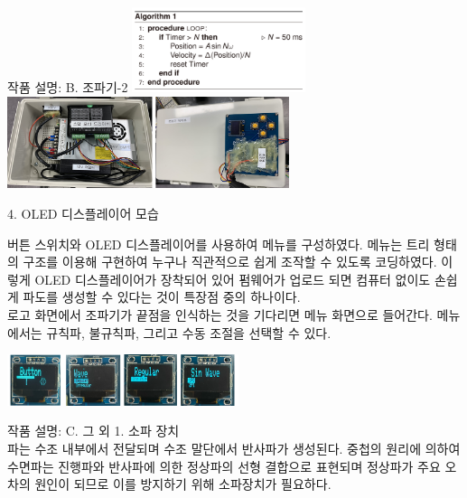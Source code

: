 \documentclass[Junlampaper, portrait]{Junlam_PosterK}
\begin{document}
\begin{poster}
\begin{posterbox}[name=circuit,column=1,below=wtank]{작품 설명: B. 조파기-2}
      \includegraphics[width=0.38\textwidth]{images/algorithm.pdf} 
      \includegraphics[width=0.62\textwidth]{images/made.png} 
     \label{algotithm}

\vspace{1.0em}
\small {4. OLED 디스플레이어 모습 \\}
    \scriptsize {
    
    버튼 스위치와 OLED 디스플레이어를 사용하여 메뉴를 구성하였다. 메뉴는 트리 형태의 구조를 이용해 구현하여 누구나 직관적으로 쉽게 조작할 수 있도록 코딩하였다. 이렇게 OLED 디스플레이어가 장착되어 있어 펌웨어가 업로드 되면 컴퓨터 없이도 손쉽게 파도를 생성할 수 있다는 것이 특장점 중의 하나이다. \\
    로고 화면에서 조파기가 끝점을 인식하는 것을 기다리면 메뉴 화면으로 들어간다. 메뉴에서는 규칙파, 불규칙파, 그리고 수동 조절을 선택할 수 있다. \\}
    
            \includegraphics[width=\textwidth, height=1.5cm]{images/OLED.png} 
        \label{Oled}
\vspace{4.0em}
\end{posterbox}

\begin{posterbox}[name=wmaker,column=2, below=wtank] {작품 설명: C. 그 외} %
\small {1. 소파 장치\\}
    \scriptsize {
    파는 수조 내부에서 전달되며 수조 말단에서 반사파가 생성된다. 중첩의 원리에 의하여 수면파는 진행파와 반사파에 의한 정상파의 선형 결합으로 표현되며 정상파가 주요 오차의 원인이 되므로 이를 방지하기 위해 소파장치가 필요하다.\\}


\end{posterbox}
\end{poster}
\end{document}
